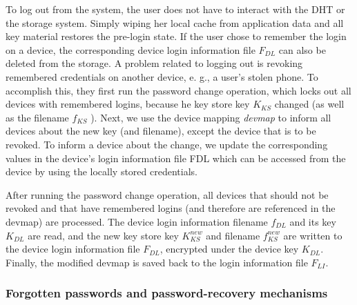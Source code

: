 To log out from the system, the user does not have to interact
with the DHT or the storage system. Simply wiping her local
cache from application data and all key material restores the
pre-login state. If the user chose to remember the login on a
device, the corresponding device login information file $F_{DL}$
can also be deleted from the storage.
 A problem related to logging out is revoking remembered
credentials on another device, e. g., a user’s stolen phone. To
accomplish this, they first run the password change operation,
which locks out all devices with remembered logins, because
he key store key $K_{KS}$ changed (as well as the filename $f_{KS}$ ).
Next, we use the device mapping \textit{devmap} to inform all devices
about the new key (and filename), except the device that is to
be revoked. To inform a device about the change, we update
the corresponding values in the device’s login information file
 FDL which can be accessed from the device by using the
locally stored credentials.

 After running the password change
operation, all devices that should not be revoked and that have remembered
logins (and therefore are referenced in the devmap) are
processed. The device login information filename $f_{DL}$ and its key $K_{DL}$ are read,
and the new key store key $K_{KS}^{new}$ and filename $f_{KS}^{new}$ are written to the
device login information file $F_{DL}$, encrypted under the device key $K_{DL}$.
Finally, the modified devmap is saved back to the login information file $F_{LI}$.


\subsubsection{Forgotten passwords and password-recovery mechanisms}

